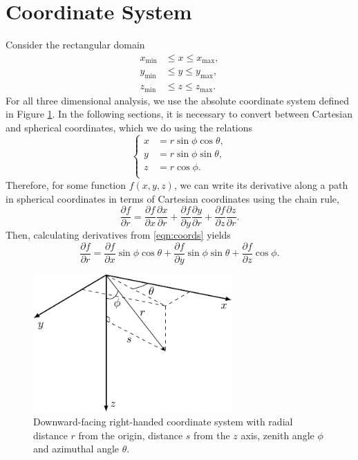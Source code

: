 \documentclass[ms,cpyr,lof,lot]{uathesis}
\newcommand\xmin{{x_{\min}}}
\newcommand\xmax{{x_{\max}}}
\newcommand\ymin{{y_{\min}}}
\newcommand\ymax{{y_{\max}}}
\newcommand\zmin{{z_{\min}}}
\newcommand\zmax{{z_{\max}}}
\begin{document}
\section{Coordinate System}
Consider the rectangular domain
\begin{align*}
  \xmin &\leq x \leq \xmax, \\
  \ymin &\leq y \leq \ymax, \\
  \zmin &\leq z \leq \zmax.
\end{align*}
For all three dimensional analysis, we use the absolute coordinate system defined in Figure \ref{fig:3dcoords}.
In the following sections, it is necessary to convert between Cartesian and spherical coordinates, which we do using the relations
\begin{equation}
  \left\{
	\begin{split}
		x & = r\sin\phi\cos\theta, \\
		y & = r\sin\phi\sin\theta, \\
		z & = r\cos\phi. \\
	\end{split}
  \right.
	\label{eqn:coords}
\end{equation}
Therefore, for some function $f(x,y,z)$, we can write its derivative along a path in spherical coordinates in terms of Cartesian coordinates using the chain rule,
\begin{equation*}
	\frac{\partial f}{\partial r}
	=\frac{\partial f}{\partial x}\frac{\partial x}{\partial r}
	+ \frac{\partial f}{\partial y}\frac{\partial y}{\partial r}
	+ \frac{\partial f}{\partial z}\frac{\partial z}{\partial r}.
\end{equation*}
Then, calculating derivatives from \eqref{eqn:coords} yields
\begin{equation}
	\frac{\partial f}{\partial r}
	=\frac{\partial f}{\partial x}\sin\phi\cos\theta
	+ \frac{\partial f}{\partial y}\sin\phi\sin\theta
	+ \frac{\partial f}{\partial z}\cos\phi.
	\label{eqn:partials}
\end{equation}
\begin{figure}[H]
	\centering
	\includegraphics[width=3in]{3d_coords}
	\caption{Downward-facing right-handed coordinate system with radial distance $r$ from the origin, distance $s$ from the $z$ axis, zenith angle $\phi$ and azimuthal angle $\theta$.}
	\label{fig:3dcoords}
\end{figure}
\end{document}
